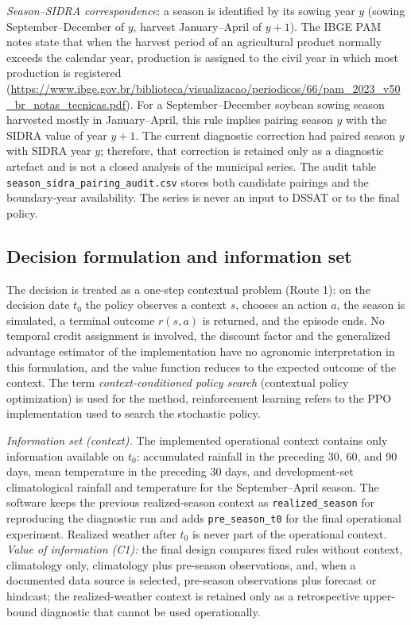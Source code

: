 \documentclass[times,final,authoryear]{elsarticle}
\begin{document}
\emph{Season--SIDRA correspondence}: a season is identified by its sowing year $y$ (sowing September--December of $y$, harvest January--April of $y+1$). The IBGE PAM notes state that when the harvest period of an agricultural product normally exceeds the calendar year, production is assigned to the civil year in which most production is registered (\url{https://www.ibge.gov.br/biblioteca/visualizacao/periodicos/66/pam_2023_v50_br_notas_tecnicas.pdf}). For a September--December soybean sowing season harvested mostly in January--April, this rule implies pairing season $y$ with the SIDRA value of year $y+1$. The current diagnostic correction had paired season $y$ with SIDRA year $y$; therefore, that correction is retained only as a diagnostic artefact and is not a closed analysis of the municipal series. The audit table \texttt{season\_sidra\_pairing\_audit.csv} stores both candidate pairings and the boundary-year availability. The series is never an input to DSSAT or to the final policy.


\subsection{Decision formulation and information set}
\label{subdecision}

The decision is treated as a one-step contextual problem (Route 1): on the decision date $t_0$ the policy observes a context $s$, chooses an action $a$, the season is simulated, a terminal outcome $r(s,a)$ is returned, and the episode ends. No temporal credit assignment is involved, the discount factor and the generalized advantage estimator of the implementation have no agronomic interpretation in this formulation, and the value function reduces to the expected outcome of the context. The term \emph{context-conditioned policy search} (contextual policy optimization) is used for the method, reinforcement learning refers to the PPO implementation used to search the stochastic policy.

\emph{Information set (context).} The implemented operational context contains only information available on $t_0$: accumulated rainfall in the preceding 30, 60, and 90 days, mean temperature in the preceding 30 days, and development-set climatological rainfall and temperature for the September--April season. The software keeps the previous realized-season context as \texttt{realized\_season} for reproducing the diagnostic run and adds \texttt{pre\_season\_t0} for the final operational experiment. Realized weather after $t_0$ is never part of the operational context. \emph{Value of information (C1):} the final design compares fixed rules without context, climatology only, climatology plus pre-season observations, and, when a documented data source is selected, pre-season observations plus forecast or hindcast; the realized-weather context is retained only as a retrospective upper-bound diagnostic that cannot be used operationally.
\end{document}
